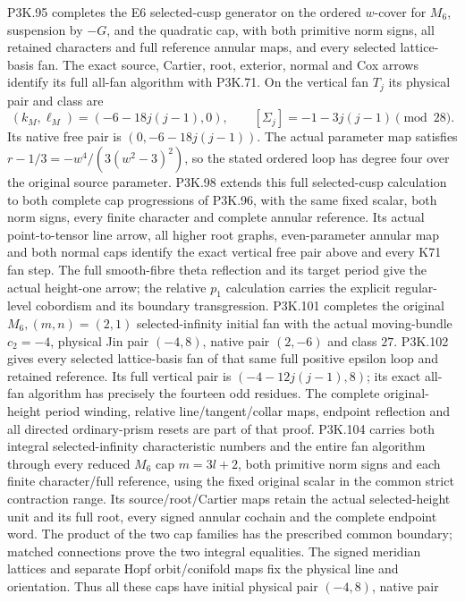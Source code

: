 \begin{theorem}
P3K.95 completes the E6 selected-cusp generator on the ordered
\(w\)-cover for \(M_6\), suspension by \(-G\), and the quadratic
cap, with both primitive norm signs, all retained characters and
full reference annular maps, and every selected lattice-basis fan.
The exact source, Cartier, root, exterior, normal and Cox arrows
identify its full all-fan algorithm with P3K.71. On the vertical fan
\(T_j\) its physical pair and class are
\[
 (k_M,\ell_M)=(-6-18j(j-1),0),\qquad
 [\Sigma_j]=-1-3j(j-1)\pmod {28}.
\]
Its native free pair is \((0,-6-18j(j-1))\). The actual parameter
map satisfies \(r-1/3=-w^4/(3(w^2-3)^2)\), so the stated
ordered loop has degree four over the original source parameter.
P3K.98 extends this full selected-cusp calculation to both complete
cap progressions of P3K.96, with the same fixed scalar, both norm signs,
every finite character and complete annular reference. Its actual
point-to-tensor line arrow, all higher root graphs, even-parameter
annular map and both normal caps identify the exact vertical free
pair above and every K71 fan step. The full smooth-fibre theta
reflection and its target period give the actual height-one arrow;
the relative \(p_1\) calculation carries the explicit regular-level
cobordism and its boundary transgression.
P3K.101 completes the original \(M_6,(m,n)=(2,1)\)
selected-infinity initial fan with the actual moving-bundle
\(c_2=-4\), physical Jin pair \((-4,8)\), native pair
\((2,-6)\) and class \(27\). P3K.102 gives every selected
lattice-basis fan of that same full positive epsilon loop and
retained reference. Its full vertical pair is
\((-4-12j(j-1),8)\); its exact all-fan algorithm has precisely
the fourteen odd residues. The complete original-height period
winding, relative line/tangent/collar maps, endpoint reflection
and all directed ordinary-prism resets are part of that proof.
P3K.104 carries both integral selected-infinity characteristic
numbers and the entire fan algorithm through every reduced
\(M_6\) cap \(m=3l+2\), both primitive norm signs and each
finite character/full reference, using the fixed original scalar
in the common strict contraction range. Its source/root/Cartier
maps retain the actual selected-height unit and its full root,
every signed annular cochain and the complete endpoint word.
The product of the two cap families has the prescribed common
boundary; matched connections prove the two integral equalities.
The signed meridian lattices and separate Hopf orbit/conifold
maps fix the physical line and orientation. Thus all these
caps have initial physical pair \((-4,8)\), native pair

\end{theorem}

